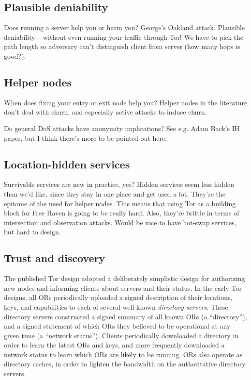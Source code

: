 \documentclass{llncs}
\begin{document}
\subsection{Plausible deniability}

Does running a server help you or harm you? George's Oakland attack.
Plausible deniability -- without even running your traffic through Tor! We
have to pick the path length so adversary can't distinguish client from
server (how many hops is good?).

\subsection{Helper nodes}

When does fixing your entry or exit node help you?
Helper nodes in the literature don't deal with churn, and
especially active attacks to induce churn.

Do general DoS attacks have anonymity implications? See e.g. Adam
Back's IH paper, but I think there's more to be pointed out here.

\subsection{Location-hidden services}

Survivable services are new in practice, yes? Hidden services seem
less hidden than we'd like, since they stay in one place and get used
a lot. They're the epitome of the need for helper nodes. This means
that using Tor as a building block for Free Haven is going to be really
hard. Also, they're brittle in terms of intersection and observation
attacks. Would be nice to have hot-swap services, but hard to design.

\subsection{Trust and discovery}

The published Tor design adopted a deliberately simplistic design for
authorizing new nodes and informing clients about servers and their status.
In the early Tor designs, all ORs periodically uploaded a signed description
of their locations, keys, and capabilities to each of several well-known {\it
  directory servers}.  These directory servers constructed a signed summary
of all known ORs (a ``directory''), and a signed statement of which ORs they
believed to be operational at any given time (a ``network status'').  Clients
periodically downloaded a directory in order to learn the latest ORs and
keys, and more frequently downloaded a network status to learn which ORs are
likely to be running.  ORs also operate as directory caches, in order to
lighten the bandwidth on the authoritative directory servers.
\end{document}
